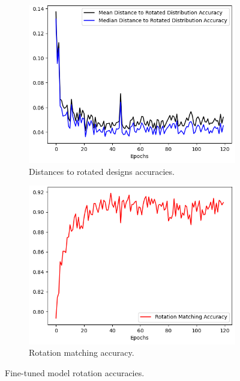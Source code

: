 \begin{figure}[h]
    \begin{subfigure}[h]{0.5\linewidth}
        \includegraphics[width=\columnwidth]{images/rotation_metrics_evolution_openshape.png}
        \caption{Distances to rotated designs accuracies.}
    \end{subfigure}
    \hfill
    \begin{subfigure}[h]{0.5\linewidth}
        \includegraphics[width=\columnwidth]{images/rotation_accuracy_evolution_openshape.png}
        \caption{Rotation matching accuracy.}
    \end{subfigure}
    \caption{Fine-tuned model rotation accuracies.}
    \label{fig:rotation_metrics_evolution_openshape}
\end{figure}

